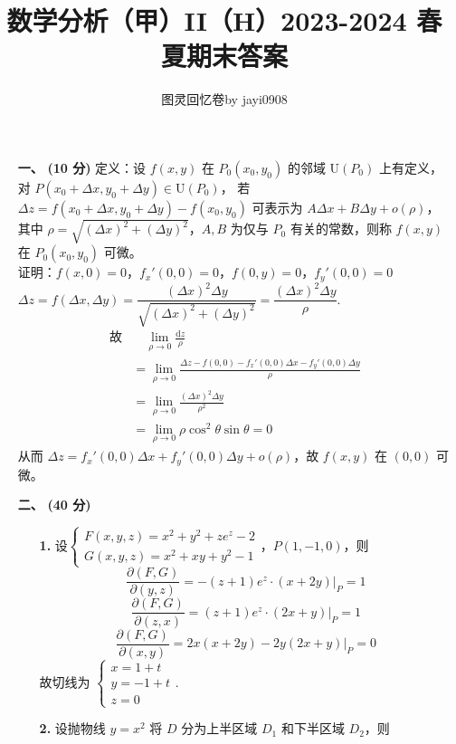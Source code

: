 \documentclass{ctexart}
\title{\vspace{-4em}\textbf{数学分析（甲）II（H）2023-2024 春夏期末答案}}
\author{图灵回忆卷\quad\quad by jayi0908}
\begin{document}
\maketitle

\begin{enumerate}
    \item[\textbf{一、}] \textbf{(10 分)} 定义：设 $f(x,y)$ 在 $P_0(x_0,y_0)$ 的邻域 $\mathrm{U}(P_0)$ 上有定义，对 $P(x_0+\Delta x, y_0+\Delta y)\in\mathrm{U}(P_0)$，
    若 $\Delta z = f(x_0+\Delta x, y_0+\Delta y)-f(x_0, y_0)$ 可表示为 
    $A\Delta x+B\Delta y+o(\rho)$，\\
    其中 $\rho=\sqrt{(\Delta x)^2+(\Delta y)^2}$，$A,B$ 为仅与 $P_0$ 有关的常数，则称 $f(x,y)$ 在 $P_0(x_0,y_0)$ 可微。 \\
    证明：$f(x,0)=0$，$f_x'(0,0)=0$，$f(0,y)=0$，$f_y'(0,0)=0$ \\
    $\Delta z=f(\Delta x,\Delta y)=\dfrac{(\Delta x)^2\Delta y}{\sqrt{(\Delta x)^2+(\Delta y)^2}}=\dfrac{(\Delta x)^2\Delta y}{\rho}.$
    \begin{align*} 
    \text{故}& \quad\lim_{\rho \to 0}\frac{\mathrm{d}z}{\rho} \\
    & =\lim_{\rho \to 0}\frac{\Delta z-f(0,0)-f_x'(0,0)\Delta x-f_y'(0,0)\Delta y}{\rho} \\
    & =\lim_{\rho \to 0}\frac{(\Delta x)^2\Delta y}{\rho^2} \\
    & =\lim_{\rho \to 0}\rho\cos^2\theta\sin\theta=0
    \end{align*}
    从而 $\Delta z=f_x'(0,0)\Delta x+f_y'(0,0)\Delta y+o(\rho)$，故 $f(x,y)$ 在 $(0,0)$ 可微。
    \item[\textbf{二、}] \textbf{(40 分)}
    \begin{enumerate}
        \item[\textbf{1.}] 设$\begin{cases}
        F(x,y,z)=x^2+y^2+ze^z-2 \\
        G(x,y,z)=x^2+xy+y^2-1
        \end{cases}$，$P(1,-1,0)$，则
        \[\frac{\partial(F,G)}{\partial(y,z)}=-(z+1)e^z\cdot(x+2y)\vert_P=1\]
        \[\frac{\partial(F,G)}{\partial(z,x)}=(z+1)e^z\cdot(2x+y)\vert_P=1\]
        \[\frac{\partial(F,G)}{\partial(x,y)}=2x(x+2y)-2y(2x+y)\vert_P=0\]
        故切线为 $\begin{cases}
        x=1+t \\
        y=-1+t \\
        z=0
        \end{cases}$.
        \item[\textbf{2.}] 设抛物线 $y=x^2$ 将 $D$ 分为上半区域 $D_1$ 和下半区域 $D_2$，则

\end{enumerate}
\end{enumerate}
\end{document}
